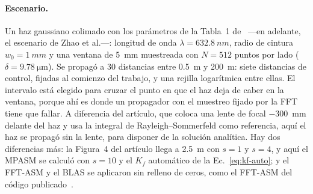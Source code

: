 \paragraph{Escenario.} Un haz gaussiano colimado con los parámetros de la
Tabla~1 de~\cite{zhao2020} ---en adelante, el escenario de Zhao et al.---:
longitud de onda $\lambda = \SI{632.8}{nm}$, radio
de cintura $w_0 = \SI{1}{mm}$ y una ventana de \SI{5}{mm} muestreada con
$N = 512$ puntos por lado ($\delta = \SI{9.78}{\micro\metre}$). Se propagó a 30
distancias entre \SI{0.5}{m} y \SI{200}{m}: siete distancias de control,
fijadas al comienzo del trabajo, y una rejilla logarítmica entre ellas. El
intervalo está elegido para cruzar el punto en que el haz deja de caber en la
ventana, porque ahí es donde un propagador con el muestreo fijado por la FFT
tiene que fallar. A diferencia del artículo, que coloca una lente de focal
\SI{-300}{mm} delante del haz y usa la integral de Rayleigh--Sommerfeld como
referencia, aquí el haz se propagó sin la lente, para disponer de la solución
analítica. Hay dos diferencias más: la Figura~4 del artículo llega a
\SI{2.5}{m} con $s = 1$ y $s = 4$, y aquí el MPASM se calculó con $s = 10$ y
el $K_f$ automático de la Ec.~\eqref{eq:kf-auto}; y el FFT-ASM y el BLAS se
aplicaron sin relleno de ceros, como el FFT-ASM del código
publicado~\cite{zhao2020code}.

